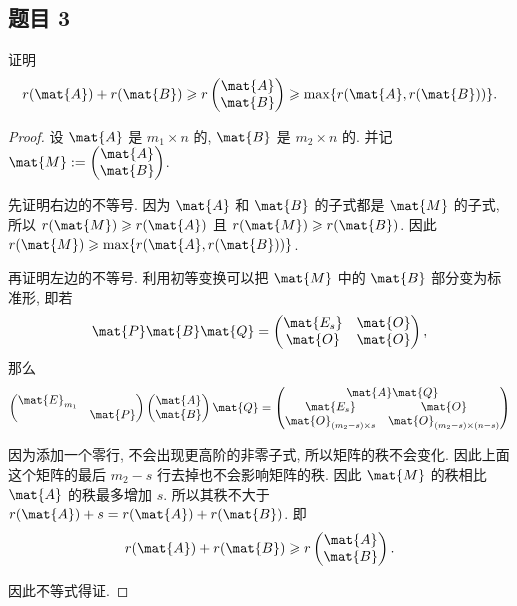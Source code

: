 \newpage
\subsection*{题目 3}
\begin{problem*}
证明
\[
r(\mat{A}) + r(\mat{B}) \geqslant r\left(\begin{matrix}\mat{A} \\ \mat{B} \end{matrix}\right) \geqslant \max\{r(\mat{A}, r(\mat{B}))\}.
\]
\end{problem*}
\begin{proof}
设 $\mat{A}$ 是 $m_1 \times n$ 的,  $\mat{B}$ 是 $m_2 \times n$ 的. 并记 $\mat{M} := \left(\begin{matrix}\mat{A} \\ \mat{B} \end{matrix}\right)$.

先证明右边的不等号. 因为 $\mat{A}$ 和 $\mat{B}$ 的子式都是 $\mat{M}$ 的子式, 所以 $r(\mat{M}) \geqslant r(\mat{A})$ 且 $r(\mat{M}) \geqslant r(\mat{B})$. 因此 $r(\mat{M}) \geqslant \max\{r(\mat{A}, r(\mat{B}))\}$.

再证明左边的不等号. 利用初等变换可以把 $\mat{M}$ 中的 $\mat{B}$ 部分变为标准形, 即若
\[
    \mat{P}\mat{B}\mat{Q} = \begin{pmatrix}
        \mat{E_s} & \mat{O} \\
        \mat{O} & \mat{O}
    \end{pmatrix},
\]
那么
\[
\begin{pmatrix}
    \mat{E}_{m_1} & \\
    & \mat{P}
\end{pmatrix}
\begin{pmatrix}
    \mat{A} \\
    \mat{B}
\end{pmatrix}
\mat{Q}
=
\begin{pmatrix}
    \multicolumn{2}{c}{\mat{A}\mat{Q}} \\
    \mat{E_s} & \mat{O} \\
    \mat{O}_{(m_2 - s) \times s} & \mat{O}_{(m_2 - s) \times (n - s)}
\end{pmatrix}
\]

因为添加一个零行, 不会出现更高阶的非零子式, 所以矩阵的秩不会变化. 因此上面这个矩阵的最后 $m_2 - s$ 行去掉也不会影响矩阵的秩. 因此 $\mat{M}$ 的秩相比 $\mat{A}$ 的秩最多增加 $s$. 所以其秩不大于 $r(\mat{A}) + s = r(\mat{A}) + r(\mat{B})$. 即
\[
r(\mat{A}) + r(\mat{B}) \geqslant r\left(\begin{matrix}\mat{A} \\ \mat{B} \end{matrix}\right).
\]

因此不等式得证.
\end{proof}

